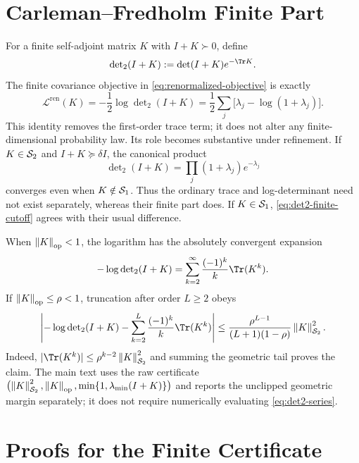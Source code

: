 \section{Carleman--Fredholm Finite Part}
\label{app:det2}

For a finite self-adjoint matrix $K$ with $I+K\succ0$, define
\begin{equation}
  \det\nolimits_2(I+K):=\det(I+K)e^{-\Tr K}.
\end{equation}
The finite covariance objective in \cref{eq:renormalized-objective} is exactly
\begin{equation}
  \mathcal L^{\mathrm{ren}}(K)
  =-\frac12\log\det\nolimits_2(I+K)
  =\frac12\sum_j\bigl[\lambda_j-\log(1+\lambda_j)\bigr].
  \label{eq:det2-finite-cutoff}
\end{equation}
This identity removes the first-order trace term; it does not alter any
finite-dimensional probability law. Its role becomes substantive under
refinement. If $K\in\mathcal{S}_{2}$ and $I+K\succeq\delta I$, the canonical
product
\begin{equation}
  \det\nolimits_2(I+K)
  =\prod_j(1+\lambda_j)e^{-\lambda_j}
\end{equation}
converges even when $K\notin\mathcal{S}_{1}$. Thus the ordinary trace and
log-determinant need not exist separately, whereas their finite part does.
If $K\in\mathcal{S}_{1}$, \cref{eq:det2-finite-cutoff} agrees with their usual
difference.

When $\left\lVert K \right\rVert_{\mathrm{op}}<1$, the logarithm has the absolutely convergent expansion
\begin{equation}
  -\log\det\nolimits_2(I+K)
  =\sum_{k=2}^{\infty}\frac{(-1)^k}{k}\Tr(K^k).
  \label{eq:det2-series}
\end{equation}
If $\left\lVert K \right\rVert_{\mathrm{op}}\le\rho<1$, truncation after order $L\ge2$ obeys
\begin{equation}
  \left|
    -\log\det\nolimits_2(I+K)
    -\sum_{k=2}^{L}\frac{(-1)^k}{k}\Tr(K^k)
  \right|
  \le
  \frac{\rho^{L-1}}{(L+1)(1-\rho)}\hsnorm{K}^{2}.
  \label{eq:det2-truncation}
\end{equation}
Indeed, $|\Tr(K^k)|\le\rho^{k-2}\hsnorm{K}^2$ and summing the geometric
tail proves the claim. The main text uses the raw certificate
$\bigl(\left\lVert K \right\rVert_{\mathcal{S}_{2}}^2,\left\lVert K \right\rVert_{\mathrm{op}},
\min\{1,\lambda_{\min}(I+K)\}\bigr)$ and reports the unclipped geometric
margin separately; it does not require numerically evaluating
\cref{eq:det2-series}.


\section{Proofs for the Finite Certificate}
\label{app:finite-certificate-proof}

